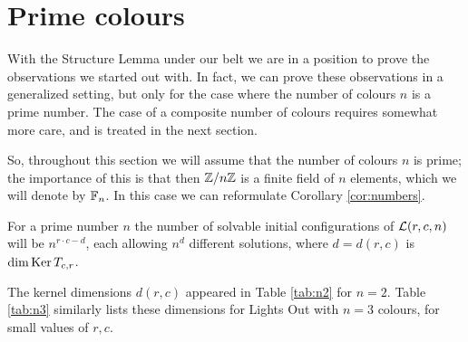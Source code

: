 \section{Prime colours}\label{sec:prime}
With the Structure Lemma under our belt we are in a position
to prove the observations we started out with. In fact, we
can prove these observations in a generalized setting, but
only for the case where the number of colours $n$ is a
prime number. The case of a composite number of colours
requires somewhat more care, and is treated in the next section.

So, throughout this section we will assume that the
number of colours $n$ is prime; the importance
of this is that then $\mathbb{Z}/n\mathbb{Z}$ is a finite field of $n$
elements, which we will denote by $\mathbb F_n$. In this case
we can reformulate Corollary \ref{cor:numbers}.

\begin{corollary}\label{cor:prime}
For a prime number $n$ the number of solvable initial
configurations of $\mathcal{L}(r,c,n)$ will be $n^{r\cdot c-d}$, each
allowing $n^d$ different solutions, where $d=d(r,c)$ is
	$\dim\operatorname{Ker} T_{c,r}$.
\end{corollary}
%
The kernel dimensions $d(r,c)$ appeared in Table \ref{tab:n2} for $n=2$.
Table \ref{tab:n3} similarly lists these dimensions for Lights Out
with $n=3$ colours, for small values of $r, c$.

